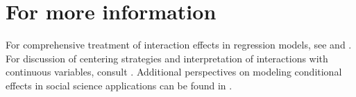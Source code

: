 \section*{For more information}
For comprehensive treatment of interaction effects in regression models, see \citep{fox} and \citep{hill}. For discussion of centering strategies and interpretation of interactions with continuous variables, consult \citep{cohen1988statistical}. Additional perspectives on modeling conditional effects in social science applications can be found in \citep{agresti}.
